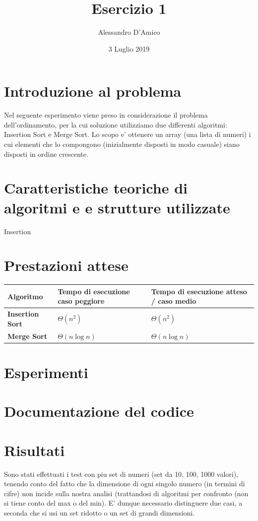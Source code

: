 \documentclass[a4paper]{article}
\title {{\TitleFont Esercizio 1}}
\date{3 Luglio 2019}
\author{{\AuthFont Alessandro D'Amico}}
\begin{document}
\begin{titlingpage}
\maketitle
\end{titlingpage}
\tableofcontents
\newpage
\section{Introduzione al problema}
Nel seguente esperimento viene preso in considerazione il problema dell'ordinamento, per la cui soluzione utilizziamo due differenti algoritmi: Insertion Sort e Merge Sort.
Lo scopo e' ottenere un array (una lista di numeri) i cui elementi che lo compongono (inizialmente disposti in modo casuale) siano disposti in ordine crescente.
\section{Caratteristiche teoriche di algoritmi e e strutture utilizzate}
Insertion
\section{Prestazioni attese}
	\begin{tabularx}{10cm}{|X|X|X|}
	\hline
	Algoritmo & Tempo di esecuzione caso peggiore & Tempo di esecuzione atteso / caso medio \\
	\hline
	\textbf{Insertion Sort} & $\Theta(n^2)$  & $\Theta(n^2)$ \\
	\hline
	\textbf{Merge Sort} &  $\Theta(n\log{}n)$ & $\Theta(n\log{}n)$\\
	\hline
	\end{tabularx}
\section{Esperimenti}
\section{Documentazione del codice}
\newpage
\section{Risultati}
Sono stati effettuati i test con piu set di numeri (set da 10, 100, 1000 valori), tenendo conto del fatto che la dimensione di ogni singolo numero (in termini di cifre) non incide sulla nostra analisi (trattandosi di algoritmi per confronto (non si tiene conto del max o del min). E' dunque necessario distinguere due casi, a seconda che si usi un set ridotto o un set di grandi dimensioni. 
\end{document}
